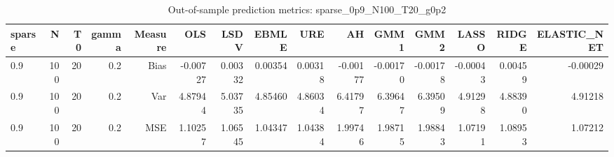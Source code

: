 \begin{table}[!htbp]\centering
\caption{Out-of-sample prediction metrics: sparse_0p9_N100_T20_g0p2}
\label{tab:table3_sparse_0p9_N100_T20_g0p2}
\begin{tabular}{lrrrrrrrrrrrrrr}
\hline
sparse & N & T0 & gamma & Measure & OLS & LSDV & EBMLE & URE & AH & GMM1 & GMM2 & LASSO & RIDGE & ELASTIC_NET \\
\hline
0.9 & 100 & 20 & 0.2 & Bias & -0.00727 & 0.00332 & 0.00354 & 0.00318 & -0.00177 & -0.00170 & -0.00178 & -0.00043 & 0.00459 & -0.00029 \\
0.9 & 100 & 20 & 0.2 & Var & 4.87944 & 5.03735 & 4.85460 & 4.86034 & 6.41797 & 6.39647 & 6.39509 & 4.91298 & 4.88390 & 4.91218 \\
0.9 & 100 & 20 & 0.2 & MSE & 1.10257 & 1.06545 & 1.04347 & 1.04384 & 1.99746 & 1.98715 & 1.98843 & 1.07191 & 1.08953 & 1.07212 \\
\hline
\end{tabular}
\end{table}

